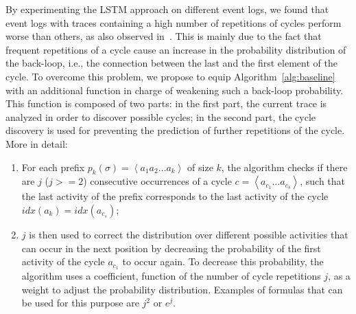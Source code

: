 By experimenting the LSTM approach on different event logs, we found that event logs with traces containing a high number of repetitions of cycles perform worse than others, as also observed in~\cite{niek96732}. This is mainly due to the fact that frequent repetitions of a cycle cause an increase in the probability distribution of the back-loop, i.e., the connection between the last and the first element of the cycle.
To overcome this problem, we propose to equip Algorithm~\ref{alg:baseline} with an additional function in charge of weakening such a back-loop probability. This function is composed of two parts: in the first part, the current trace is analyzed in order to discover possible cycles; in the second part, the cycle discovery is used for preventing the prediction of further repetitions of the cycle. %
More in detail:
\begin{enumerate}
\item For each prefix $p_k(\sigma)=\left\langle a_1a_2 \ldots a_k\right\rangle$ of size $k$, the algorithm checks if there are $j$ ($j>=2$) consecutive occurrences of a cycle $c=\left\langle a_{c_1}\ldots a_{c_s}\right\rangle$, such that the last activity of the prefix corresponds to the last activity of the cycle $idx(a_k)=idx(a_{c_s})$;
\item $j$ is then used to correct the distribution over different possible activities that can occur in the next position by decreasing the probability of the first activity of the cycle $a_{c_1}$ to occur again. To decrease this probability, the algorithm uses a coefficient, function of the number of cycle repetitions $j$, as a weight to adjust the probability distribution. Examples of formulas that can be used for this purpose are $j^{2}$ or $e^{j}$.
\end{enumerate}

